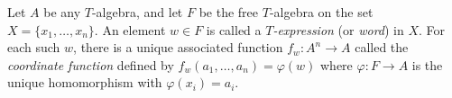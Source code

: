 Let $A$ be any $T$-algebra, and let $F$ be the free $T$-algebra on the set $X = \{x_1, \ldots, x_n\}$. An element $w \in F$ is called a \emph{$T$-expression} (or \emph{word}) in $X$. For each such $w$, there is a unique associated function $f_w: A^n \to A$ called the \emph{coordinate function} defined by $f_w(a_1, \ldots, a_n) = \varphi(w)$ where $\varphi: F \to A$ is the unique homomorphism with $\varphi(x_i) = a_i$.
